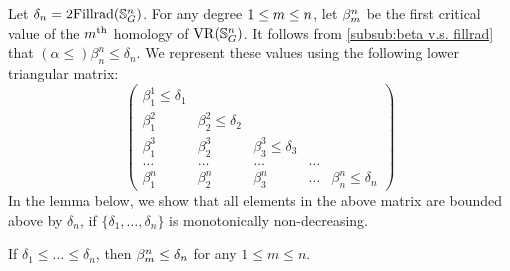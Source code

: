\subsubsection{}\label{subsub:foundamental_bar_rpn_lemma}

Let $\delta_n=2\mathrm{Fillrad}(\mathbb{S}^n_G)$.
For any degree $1 \leq m \leq n$, let $\beta_{m}^{n}$ be the first critical value of the $m^{\mathrm{th}}$ homology of $\operatorname{VR}(\mathbb{S}^n_G)$.
It follows from \cref{subsub:beta v.s. fillrad} that $(\alpha \leq) \beta_{n}^{n} \leq \delta_n$.
We represent these values using the following lower triangular matrix:
\[
\begin{pmatrix}
	\beta_{1}^{1}\leq \delta_1 & & &&\\
	\beta_1^2 & \beta_{2}^{2} \leq \delta_2 & &&\\
	\beta_1^3 & \beta_{2}^{3} & \beta_{3}^{3} \leq \delta_3 &&\\
	\dots & \dots & \dots & \dots &\\
	\beta_1^n & \beta_2^n & \beta_3^n & \dots & \beta_n^n \leq \delta_n
\end{pmatrix}
\]
In the lemma below, we show that all elements in the above matrix are bounded above by $\delta_n$, if $\{\delta_1, \dots, \delta_n\}$ is monotonically non-decreasing.

\medskip\lemma
If $\delta_1 \leq \dots \leq \delta_n$, then $\beta_{m}^{n} \leq \delta_n$ for any $1 \leq m \leq n$.

